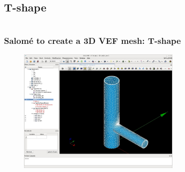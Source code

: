 \documentclass[10pt, hyperref={unicode=true,pdfusetitle, bookmarks=true,bookmarksnumbered=false,bookmarksopen=false, breaklinks=false,pdfborder={0 0 1},backref=true,colorlinks=true,linkcolor=darkblue,pageanchor}]{beamer}
\begin{document}
\subsection{T-shape}
\begin{frame}
\begin{small}
\begin{columns}[c] 
\tableofcontents[sections={1-9},currentsection, currentsubsection]
\tableofcontents[sections={10-16},currentsection, currentsubsection]
\end{columns}
\end{small}
\end{frame}
\begin{frame}
\frametitle{Salom\'e to create a 3D VEF mesh: T-shape}

\begin{figure}
\includegraphics[width=0.7\textwidth]{PICTURES/salome17.jpg}
\end{figure}

\end{frame}
\end{document}
